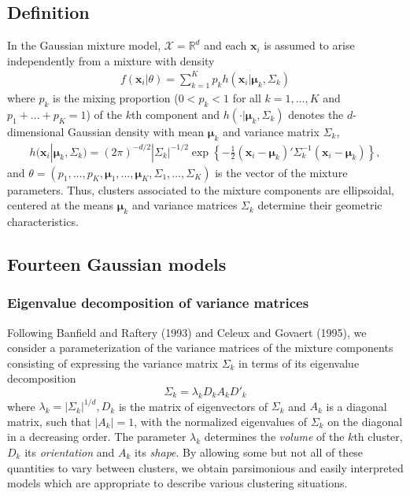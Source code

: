 \documentclass[12pt]{article}
\newcommand{\IR}{\mathbb{R}}
\newcommand{\bx}{\mathbf{x}}
\newcommand{\bmu}{\boldsymbol{\mu}}
\begin{document}
\subsection{Definition}
In the Gaussian mixture model, ${\mathcal X}=\IR^d$ and each $\bx_i$ is assumed to arise independently from a mixture
with density
\begin{eqnarray}
  f(\bx_i|\theta) = \sum_{k=1}^K p_k h(\bx_i|\bmu_k,\Sigma_k)
\end{eqnarray}
where $p_k$ is the mixing proportion ($0<p_k<1$ for all $k=1,...,K$ and $p_1+...+p_K=1$) of the
$k$th component and $ h(\cdot| \bmu_k,\Sigma_k)$ denotes the $d$-dimensional Gaussian density
with mean $\bmu_k$ and variance matrix $\Sigma_k$,
\begin{eqnarray}
  h(\bx_i| \bmu_k,\Sigma_k)=(2\pi)^{-d/2}|\Sigma_k|^{-1/2}
  \exp\left\{-\frac{1}{2}(\bx_i-\bmu_k)'\Sigma_k^{-1}(\bx_i-\bmu_k)\right\},
\end{eqnarray}
and $\theta=\left(p_1,\ldots,p_{K},\bmu_1,\ldots,\bmu_K,\Sigma_1,\ldots,\Sigma_K\right)$ is
the vector of the mixture parameters. Thus, clusters associated to the mixture components are
ellipsoidal, centered at the means $\bmu_k$ and variance matrices $\Sigma_k$ determine their
geometric characteristics.

\subsection{Fourteen Gaussian models} \label{14}
\subsubsection{Eigenvalue decomposition of variance matrices}
Following Banfield and Raftery (1993) and Celeux and Govaert (1995), we consider a
parameterization of the variance matrices of the mixture components consisting of expressing
the variance matrix $\Sigma_{k}$ in terms of its eigenvalue decomposition
\begin{equation}
  \Sigma_{k}= \lambda_{k} D_{k} A_{k}D'_{k} \label{eqspectre}
\end{equation}
where $\lambda_{k}=|\Sigma_{k}|^{1/d}, D_{k}$ is the matrix of eigenvectors of $\Sigma_{k}$ and
$A_{k}$ is a diagonal matrix, such that $| A_{k} |=1$, with the normalized eigenvalues of
$\Sigma_{k}$ on the diagonal in a decreasing order. The parameter $\lambda_{k}$ determines the
\emph{volume} of the $k$th cluster, $D_{k}$ its \emph{orientation} and $A_{k}$ its
\emph{shape}.  By allowing some but not all of these quantities to vary between clusters, we
obtain parsimonious and easily interpreted models which are appropriate to describe various
clustering situations.
\end{document}
